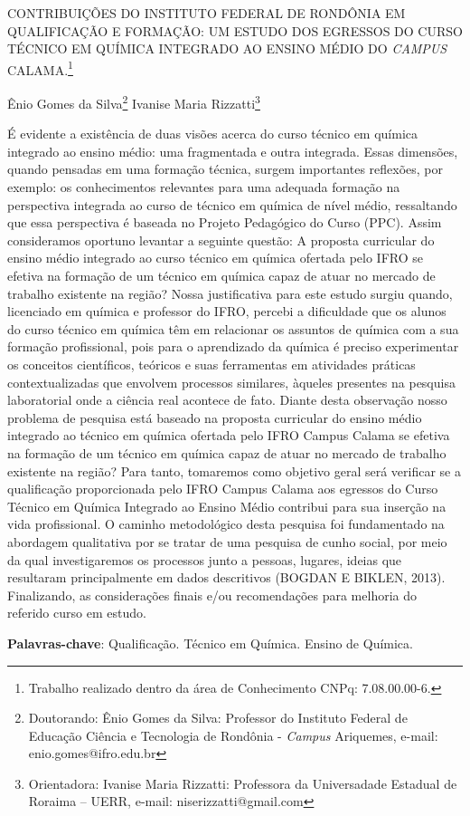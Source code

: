 \documentclass[article,12pt,onesidea,4paper,english,brazil]{abntex2}
\begin{document}
	
	
	\frenchspacing 
	
	\begin{center}
		\LARGE CONTRIBUIÇÕES DO INSTITUTO FEDERAL DE RONDÔNIA EM QUALIFICAÇÃO E FORMAÇÃO:
		UM ESTUDO DOS EGRESSOS DO CURSO TÉCNICO EM QUÍMICA INTEGRADO AO ENSINO MÉDIO DO \textit{CAMPUS} CALAMA.\footnote{Trabalho realizado dentro da área de Conhecimento CNPq: 7.08.00.00-6.}
		
		\normalsize
		Ênio Gomes da Silva\footnote{Doutorando: Ênio Gomes da Silva: Professor do Instituto Federal de Educação Ciência e Tecnologia de Rondônia - \textit{Campus} Ariquemes, e-mail: enio.gomes@ifro.edu.br} 
		Ivanise Maria Rizzatti\footnote{Orientadora: Ivanise Maria Rizzatti: Professora da Universadade Estadual de Roraima – UERR, e-mail: niserizzatti@gmail.com} 
	\end{center}
	
	\noindent É evidente a existência de duas visões acerca do curso técnico em química integrado ao
	ensino médio: uma fragmentada e outra integrada. Essas dimensões, quando pensadas em
	uma formação técnica, surgem importantes reflexões, por exemplo: os conhecimentos
	relevantes para uma adequada formação na perspectiva integrada ao curso de técnico em
	química de nível médio, ressaltando que essa perspectiva é baseada no Projeto Pedagógico
	do Curso (PPC). Assim consideramos oportuno levantar a seguinte questão: A proposta
	curricular do ensino médio integrado ao curso técnico em química ofertada pelo IFRO se
	efetiva na formação de um técnico em química capaz de atuar no mercado de trabalho
	existente na região? Nossa justificativa para este estudo surgiu quando, licenciado em
	química e professor do IFRO, percebi a dificuldade que os alunos do curso técnico em
	química têm em relacionar os assuntos de química com a sua formação profissional, pois
	para o aprendizado da química é preciso experimentar os conceitos científicos, teóricos e
	suas ferramentas em atividades práticas contextualizadas que envolvem processos
	similares, àqueles presentes na pesquisa laboratorial onde a ciência real acontece de fato.
	Diante desta observação nosso problema de pesquisa está baseado na proposta curricular
	do ensino médio integrado ao técnico em química ofertada pelo IFRO Campus Calama se
	efetiva na formação de um técnico em química capaz de atuar no mercado de trabalho
	existente na região? Para tanto, tomaremos como objetivo geral será verificar se a
	qualificação proporcionada pelo IFRO Campus Calama aos egressos do Curso Técnico em
	Química Integrado ao Ensino Médio contribui para sua inserção na vida profissional. O
	caminho metodológico desta pesquisa foi fundamentado na abordagem qualitativa por se
	tratar de uma pesquisa de cunho social, por meio da qual investigaremos os processos junto
	a pessoas, lugares, ideias que resultaram principalmente em dados descritivos (BOGDAN E
	BIKLEN, 2013). Finalizando, as considerações finais e/ou recomendações para melhoria do
	referido curso em estudo.
	
	\vspace{\onelineskip}
	
	\noindent
	\textbf{Palavras-chave}: Qualificação. Técnico em Química. Ensino de Química.
	
\end{document}
